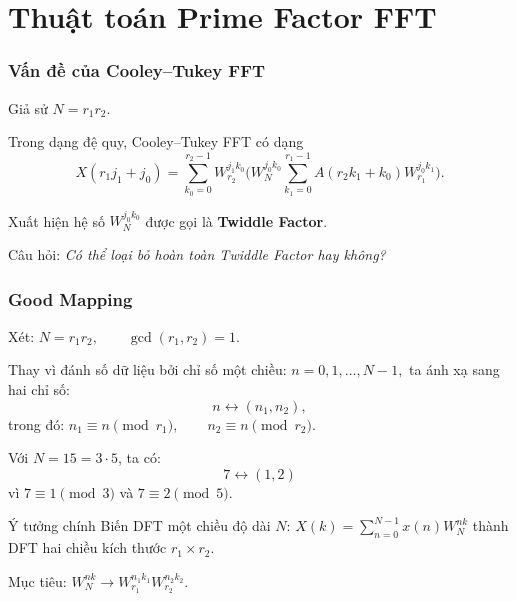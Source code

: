 \section{Thuật toán Prime Factor FFT}\begin{frame}
\frametitle{Vấn đề của Cooley--Tukey FFT}

Giả sử $N = r_1 r_2$.

Trong dạng đệ quy, Cooley--Tukey FFT có dạng
\[
X(r_1 j_1 + j_0) = \sum_{k_0=0}^{r_2-1} W_{r_2}^{j_1 k_0} \Biggl( W_N^{j_0 k_0} \sum_{k_1=0}^{r_1-1} A(r_2 k_1 + k_0) W_{r_1}^{j_0 k_1} \Biggr).
\]

\pause

Xuất hiện hệ số $W_N^{j_0 k_0}$ được gọi là \textbf{Twiddle Factor}.

\pause

Câu hỏi: \textit{Có thể loại bỏ hoàn toàn Twiddle Factor hay không?}

\end{frame}

\begin{frame}
\frametitle{Good Mapping}

Xét:
\(
N = r_1 r_2, \qquad \gcd(r_1, r_2) = 1.
\)

Thay vì đánh số dữ liệu bởi chỉ số một chiều:
\(
n = 0, 1, \dots, N-1,
\)
ta ánh xạ sang hai chỉ số:
\[
n \leftrightarrow (n_1, n_2),
\]
trong đó:
\(
n_1 \equiv n \pmod{r_1}, \qquad n_2 \equiv n \pmod{r_2}.
\)

\pause
\begin{exmp}
Với $N = 15 = 3 \cdot 5$, ta có:
\[
7 \leftrightarrow (1,2)
\]
vì $7 \equiv 1 \pmod{3}$ và $7 \equiv 2 \pmod{5}$.
\end{exmp}

\pause
\begin{block}{Ý tưởng chính}
Biến DFT một chiều độ dài $N$: $X(k) = \sum_{n=0}^{N-1} x(n) W_N^{nk}$ thành DFT hai chiều kích thước $r_1 \times r_2$.
\end{block}

Mục tiêu: $W_N^{nk} \longrightarrow W_{r_1}^{n_1 k_1} W_{r_2}^{n_2 k_2}$.
\end{frame}

